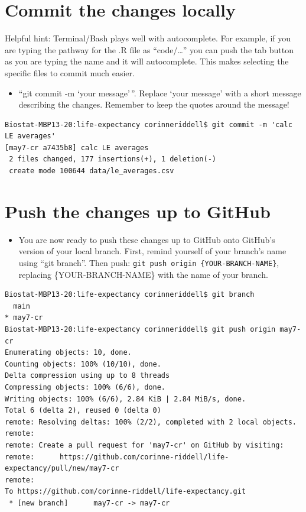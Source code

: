 \documentclass[
]{book}
\providecommand{\tightlist}{%
  \setlength{\itemsep}{0pt}\setlength{\parskip}{0pt}}
\begin{document}
\hypertarget{commit-the-changes-locally}{%
\section{Commit the changes locally}\label{commit-the-changes-locally}}

Helpful hint: Terminal/Bash plays well with autocomplete. For example, if you
are typing the pathway for the .R file as ``code/\ldots{}'' you can push the tab button
as you are typing the name and it will autocomplete. This makes selecting the
specific files to commit much easier.

\begin{itemize}
\tightlist
\item
  ``git commit -m `your message'\,''. Replace `your message' with a short message
  describing the changes. Remember to keep the quotes around the message!
\end{itemize}

\begin{verbatim}
Biostat-MBP13-20:life-expectancy corinneriddell$ git commit -m 'calc LE averages' 
[may7-cr a7435b8] calc LE averages
 2 files changed, 177 insertions(+), 1 deletion(-)
 create mode 100644 data/le_averages.csv
\end{verbatim}

\hypertarget{push-the-changes-up-to-github}{%
\section{Push the changes up to GitHub}\label{push-the-changes-up-to-github}}

\begin{itemize}
\tightlist
\item
  You are now ready to push these changes up to GitHub onto GitHub's version
  of your local branch. First, remind yourself of your branch's name using
  ``git branch''. Then push: \texttt{git\ push\ origin\ \{YOUR-BRANCH-NAME\}}, replacing
  \{YOUR-BRANCH-NAME\} with the name of your branch.
\end{itemize}

\begin{verbatim}
Biostat-MBP13-20:life-expectancy corinneriddell$ git branch
  main
* may7-cr
Biostat-MBP13-20:life-expectancy corinneriddell$ git push origin may7-cr
Enumerating objects: 10, done.
Counting objects: 100% (10/10), done.
Delta compression using up to 8 threads
Compressing objects: 100% (6/6), done.
Writing objects: 100% (6/6), 2.84 KiB | 2.84 MiB/s, done.
Total 6 (delta 2), reused 0 (delta 0)
remote: Resolving deltas: 100% (2/2), completed with 2 local objects.
remote: 
remote: Create a pull request for 'may7-cr' on GitHub by visiting:
remote:      https://github.com/corinne-riddell/life-expectancy/pull/new/may7-cr
remote: 
To https://github.com/corinne-riddell/life-expectancy.git
 * [new branch]      may7-cr -> may7-cr
\end{verbatim}
\end{document}
